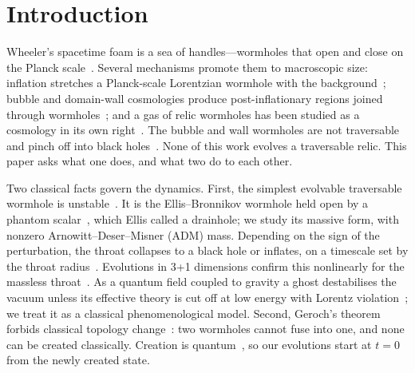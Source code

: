 \documentclass[twocolumn,floatfix,aps,prd,superscriptaddress,nofootinbib,showkeys]{revtex4-2}
\begin{document}
\section{Introduction}
\label{sec:intro}

Wheeler's spacetime foam is a sea of handles---wormholes that open and close on the Planck scale~\cite{wheeler1955,wheeler1957,misner_wheeler1957}. Several mechanisms promote them to macroscopic size: inflation stretches a Planck-scale Lorentzian wormhole with the background~\cite{roman1993}; bubble and domain-wall cosmologies produce post-inflationary regions joined through wormholes~\cite{garriga2016,deng2017,deng_vilenkin2017,gouttenoire2024}; and a gas of relic wormholes has been studied as a cosmology in its own right~\cite{kirillov2008,kirillov2011}. The bubble and wall wormholes are not traversable and pinch off into black holes~\cite{deng2017,deng_vilenkin2017}. None of this work evolves a traversable relic. This paper asks what one does, and what two do to each other.

Two classical facts govern the dynamics. First, the simplest evolvable traversable wormhole is unstable~\cite{gonzalez2009lin,bronnikov2011,cremona2019}. It is the Ellis--Bronnikov wormhole held open by a phantom scalar~\cite{ellis1973,bronnikov1973,morris_thorne1988,visser1995}, which Ellis called a drainhole; we study its massive form, with nonzero Arnowitt--Deser--Misner (ADM) mass. Depending on the sign of the perturbation, the throat collapses to a black hole or inflates, on a timescale set by the throat radius~\cite{hayward1999,shinkai2002,gonzalez2009,doroshkevich2009,hayward2009,novikov2019}. Evolutions in 3+1 dimensions confirm this nonlinearly for the massless throat~\cite{shirokov2026}. As a quantum field coupled to gravity a ghost destabilises the vacuum unless its effective theory is cut off at low energy with Lorentz violation~\cite{cline2004}; we treat it as a classical phenomenological model. Second, Geroch's theorem forbids classical topology change~\cite{geroch1967,tipler1977}: two wormholes cannot fuse into one, and none can be created classically. Creation is quantum~\cite{hawking1988}, so our evolutions start at $t=0$ from the newly created state.
\end{document}
